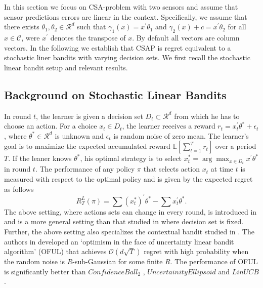 \documentclass{article}
\begin{document}
In this section we focus on CSA-problem with two sensors and assume that sensor predictions errors are linear in the context. Specifically, we assume that there exists $\theta_1, \theta_2 \in \mathcal{R}^d$ such that $\gamma_1(x)=x^\prime\theta_1$ and $\gamma_2(x)+c=x^\prime\theta_2$ for all $x \in \mathcal{C}$, were $x^\prime$ denotes the transpose of $x$. By default all vectors are column vectors. In the following we establish that CSAP is regret equivalent to a stochastic liner bandits with varying decision sets. We first recall the stochastic linear bandit setup and relevant results. 

\subsection{Background on Stochastic Linear Bandits}
In round $t$, the learner is given a decision set $D_t \subset \mathcal{R}^d$ from which he has to choose an action. For a choice $x_t \in D_t$, the learner receives a reward $r_t=x_t^\prime\theta^* + \epsilon_t$, where $\theta^* \in \mathcal{R}^d$ is unknown and $\epsilon_t$ is random noise of zero mean. The learner's goal  is to maximize the expected accumulated reward $\mathbb{E}\left[\sum_{t=1}^{T} r_t \right]$ over a period $T$. If the leaner knows $\theta^*$, his optimal strategy is to select $x_t^*=\arg \max_{x \in D_t} x^\prime \theta^* $ in round $t$. The performance of any policy $\pi$ that selects action $x_t$ at time $t$ is 
measured with respect to the optimal policy and is given by the expected regret  as follows
\begin{equation}
	\label{eqn:LinearBanditRegret}
	R^L_T(\pi)= \sum (x_t^*)^\prime \theta^* - \sum x_t^\prime \theta^* .
\end{equation}
The above setting, where actions sets can change in every round, is introduced in\cite{NIPS2011_ImprovedAlgorithms_AbbasiPalSzepes} and is a more general setting than that studied in \cite{COLT08_StochasticLinearOptimization_DaniHayesKakad,MOR11_LinearlyParametrized_RusmevichientongTsitsiklis} where decision set is fixed. Further, the above setting also specializes the contextual bandit studied in \cite{WWW10_Contextaulbandits_LiChuWei}. The authors in \cite{NIPS2011_ImprovedAlgorithms_AbbasiPalSzepes} developed an
`optimism in the face of uncertainty linear bandit algorithm' (OFUL) that achieves $\mathcal{O}(d \sqrt{T})$ regret with high probability when the random noise is $R$-sub-Gaussian for some finite $R$. The performance of OFUL is significantly better than $ConfidenceBall_2$ \cite{COLT08_StochasticLinearOptimization_DaniHayesKakad}, $UncertainityEllipsoid$ \cite{MOR11_LinearlyParametrized_RusmevichientongTsitsiklis}
and $LinUCB$ \cite{WWW10_Contextaulbandits_LiChuWei}. 
\end{document}

